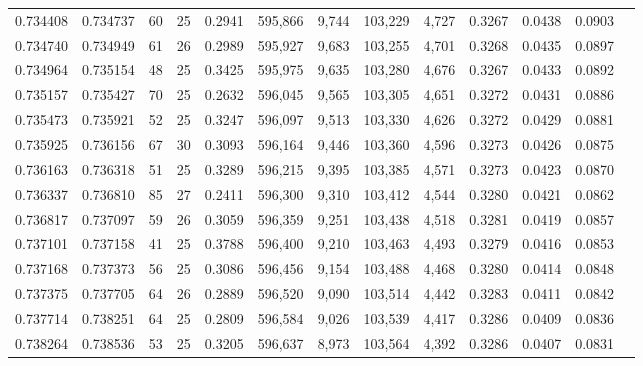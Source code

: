 \begin{tabular}{rrrrrrrrrrrrr}
0.734408 & 0.734737 &  60 &  25 &                                     0.2941 & 595,866 &   9,744 & 103,229 &   4,727 & 0.3267 & 0.0438 & 0.0903 \\
0.734740 & 0.734949 &  61 &  26 &                                     0.2989 & 595,927 &   9,683 & 103,255 &   4,701 & 0.3268 & 0.0435 & 0.0897 \\
0.734964 & 0.735154 &  48 &  25 &                                     0.3425 & 595,975 &   9,635 & 103,280 &   4,676 & 0.3267 & 0.0433 & 0.0892 \\
0.735157 & 0.735427 &  70 &  25 &                                     0.2632 & 596,045 &   9,565 & 103,305 &   4,651 & 0.3272 & 0.0431 & 0.0886 \\
0.735473 & 0.735921 &  52 &  25 &                                     0.3247 & 596,097 &   9,513 & 103,330 &   4,626 & 0.3272 & 0.0429 & 0.0881 \\
0.735925 & 0.736156 &  67 &  30 &                                     0.3093 & 596,164 &   9,446 & 103,360 &   4,596 & 0.3273 & 0.0426 & 0.0875 \\
0.736163 & 0.736318 &  51 &  25 &                                     0.3289 & 596,215 &   9,395 & 103,385 &   4,571 & 0.3273 & 0.0423 & 0.0870 \\
0.736337 & 0.736810 &  85 &  27 &                                     0.2411 & 596,300 &   9,310 & 103,412 &   4,544 & 0.3280 & 0.0421 & 0.0862 \\
0.736817 & 0.737097 &  59 &  26 &                                     0.3059 & 596,359 &   9,251 & 103,438 &   4,518 & 0.3281 & 0.0419 & 0.0857 \\
0.737101 & 0.737158 &  41 &  25 &                                     0.3788 & 596,400 &   9,210 & 103,463 &   4,493 & 0.3279 & 0.0416 & 0.0853 \\
0.737168 & 0.737373 &  56 &  25 &                                     0.3086 & 596,456 &   9,154 & 103,488 &   4,468 & 0.3280 & 0.0414 & 0.0848 \\
0.737375 & 0.737705 &  64 &  26 &                                     0.2889 & 596,520 &   9,090 & 103,514 &   4,442 & 0.3283 & 0.0411 & 0.0842 \\
0.737714 & 0.738251 &  64 &  25 &                                     0.2809 & 596,584 &   9,026 & 103,539 &   4,417 & 0.3286 & 0.0409 & 0.0836 \\
0.738264 & 0.738536 &  53 &  25 &                                     0.3205 & 596,637 &   8,973 & 103,564 &   4,392 & 0.3286 & 0.0407 & 0.0831 \\

\end{tabular}
